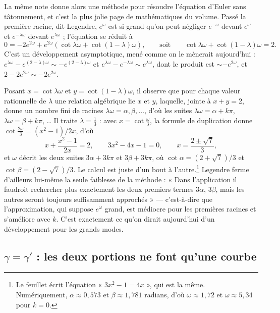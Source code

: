 \documentclass[11pt,a4paper]{article}
\begin{document}
La même note donne alors une méthode pour résoudre l'équation d'Euler sans
tâtonnement, et c'est la plus jolie page de mathématiques du volume. Passé la
première racine, dit Legendre, $e^{\omega}$ est si grand qu'on peut négliger
$e^{-\omega}$ devant $e^{\omega}$ et $e^{-\lambda\omega}$ devant
$e^{\lambda\omega}$ ; l'équation se réduit à
\[
  0 = -2e^{2\omega} + e^{2\omega}\left(\cot\lambda\omega + \cot(1-\lambda)\omega\right),
  \qquad\text{soit}\qquad
  \cot\lambda\omega + \cot(1-\lambda)\omega = 2 .
\]
C'est un développement asymptotique, mené comme on le mènerait aujourd'hui :
$e^{\lambda\omega}-e^{(2-\lambda)\omega} \sim -e^{(2-\lambda)\omega}$ et
$e^{\lambda\omega}-e^{-\lambda\omega} \sim e^{\lambda\omega}$, dont le produit
est $\sim -e^{2\omega}$, et $2-2e^{2\omega}\sim -2e^{2\omega}$.

Posant $x = \cot\lambda\omega$ et $y = \cot(1-\lambda)\omega$, il observe que
pour chaque valeur rationnelle de $\lambda$ une relation algébrique lie $x$ et
$y$, laquelle, jointe à $x+y=2$, donne un nombre fini de racines
$\lambda\omega = \alpha, \beta, \ldots$, d'où les suites
$\lambda\omega = \alpha + k\pi$, $\lambda\omega = \beta + k\pi$, \ldots{} Il
traite $\lambda = \frac13$ : avec $x = \cot\frac{\omega}{3}$, la formule de
duplication donne $\cot\frac{2\omega}{3} = (x^2-1)/2x$, d'où
\[
  x + \frac{x^2-1}{2x} = 2, \qquad 3x^2 - 4x - 1 = 0, \qquad
  x = \frac{2 \pm \sqrt{7}}{3},
\]
et $\omega$ décrit les deux suites $3\alpha + 3k\pi$ et $3\beta + 3k\pi$, où
$\cot\alpha = (2+\sqrt7)/3$ et $\cot\beta = (2-\sqrt7)/3$. Le calcul est juste
d'un bout à l'autre.\footnote{Le feuillet écrit l'équation « $3x^2 - 1 = 4x$ »,
qui est la même. Numériquement, $\alpha \approx 0{,}573$ et
$\beta \approx 1{,}781$ radians, d'où $\omega \approx 1{,}72$ et
$\omega \approx 5{,}34$ pour $k = 0$.} Legendre ferme d'ailleurs lui-même la
seule faiblesse de la méthode : « Dans l'application il faudroit rechercher
plus exactement les deux premiers termes $3\alpha$, $3\beta$, mais les autres
seront toujours suffisamment approchés » — c'est-à-dire que l'approximation,
qui suppose $e^{\omega}$ grand, est médiocre pour les premières racines et
s'améliore avec $k$. C'est exactement ce qu'on dirait aujourd'hui d'un
développement pour les grands modes.

\subsection*{$\gamma = \gamma'$ : les deux portions ne font qu'une courbe}
\end{document}
